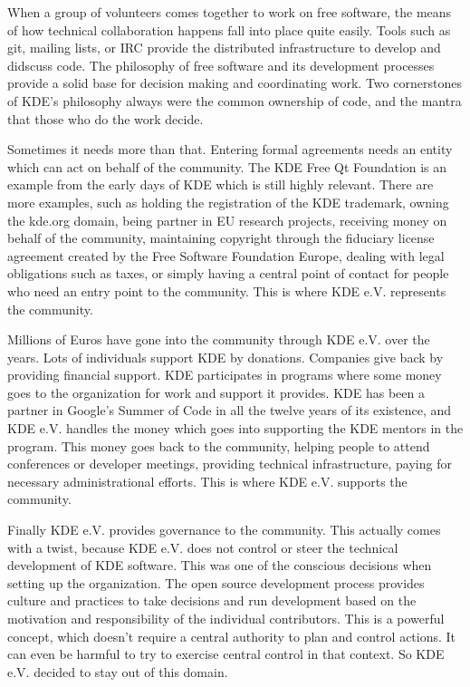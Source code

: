 When a group of volunteers comes together to work on free software, the means of how technical collaboration happens fall into place quite easily. Tools such as git, mailing lists, or IRC provide the distributed infrastructure to develop and didscuss code. The philosophy of free software and its development processes provide a solid base for decision making and coordinating work. Two cornerstones of KDE's philosophy always were the common ownership of code, and the mantra that those who do the work decide.

Sometimes it needs more than that. Entering formal agreements needs an entity which can act on behalf of the community. The KDE Free Qt Foundation is an example from the early days of KDE which is still highly relevant. There are more examples, such as holding the registration of the KDE trademark, owning the kde.org domain, being partner in EU research projects, receiving money on behalf of the community, maintaining copyright through the fiduciary license agreement created by the Free Software Foundation Europe, dealing with legal obligations such as taxes, or simply having a central point of contact for people who need an entry point to the community. This is where KDE e.V. represents the community.

Millions of Euros have gone into the community through KDE e.V. over the years. Lots of individuals support KDE by donations. Companies give back by providing financial support. KDE participates in programs where some money goes to the organization for work and support it provides. KDE has been a partner in Google's Summer of Code in all the twelve years of its existence, and KDE e.V. handles the money which goes into supporting the KDE mentors in the program. This money goes back to the community, helping people to attend conferences or developer meetings, providing technical infrastructure, paying for necessary administrational efforts. This is where KDE e.V. supports the community.

Finally KDE e.V. provides governance to the community. This actually comes with a twist, because KDE e.V. does not control or steer the technical development of KDE software. This was one of the conscious decisions when setting up the organization. The open source development process provides culture and practices to take decisions and run development based on the motivation and responsibility of the individual contributors. This is a powerful concept, which doesn't require a central authority to plan and control actions. It can even be harmful to try to exercise central control in that context. So KDE e.V. decided to stay out of this domain.

